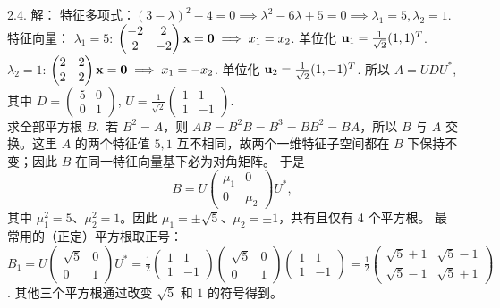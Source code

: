 \begin{exer}
2.4. 解：
特征多项式：$(3-\lambda)^2 - 4 = 0 \implies \lambda^2 - 6\lambda + 5 = 0 \implies \lambda_1 = 5, \lambda_2 = 1$.
特征向量：
$\lambda_1 = 5$: $\begin{pmatrix} -2 & 2 \\ 2 & -2 \end{pmatrix} \mathbf{x} = \mathbf{0} \implies x_1 = x_2$. 单位化 $\mathbf{u}_1 = \frac{1}{\sqrt{2}} (1, 1)^T$.
$\lambda_2 = 1$: $\begin{pmatrix} 2 & 2 \\ 2 & 2 \end{pmatrix} \mathbf{x} = \mathbf{0} \implies x_1 = -x_2$. 单位化 $\mathbf{u}_2 = \frac{1}{\sqrt{2}} (1, -1)^T$.
所以 $A = UDU^*$, 其中 $D = \begin{pmatrix} 5 & 0 \\ 0 & 1 \end{pmatrix}$, $U = \frac{1}{\sqrt{2}} \begin{pmatrix} 1 & 1 \\ 1 & -1 \end{pmatrix}$.
\\
求全部平方根 $B$.~若 $B^2=A$，则 $AB=B^2B=B^3=BB^2=BA$，所以 $B$ 与 $A$ 交换。这里 $A$ 的两个特征值 $5,1$ 互不相同，故两个一维特征子空间都在 $B$ 下保持不变；因此 $B$ 在同一特征向量基下必为对角矩阵。
于是
$$B=U\begin{pmatrix}\mu_1&0\\0&\mu_2\end{pmatrix}U^*,$$
其中 $\mu_1^2=5$、$\mu_2^2=1$。因此 $\mu_1=\pm\sqrt5$、$\mu_2=\pm1$，共有且仅有 4 个平方根。
最常用的（正定）平方根取正号：
$B_1 = U \begin{pmatrix} \sqrt{5} & 0 \\ 0 & 1 \end{pmatrix} U^* = \frac{1}{2} \begin{pmatrix} 1 & 1 \\ 1 & -1 \end{pmatrix} \begin{pmatrix} \sqrt{5} & 0 \\ 0 & 1 \end{pmatrix} \begin{pmatrix} 1 & 1 \\ 1 & -1 \end{pmatrix} = \frac{1}{2} \begin{pmatrix} \sqrt{5}+1 & \sqrt{5}-1 \\ \sqrt{5}-1 & \sqrt{5}+1 \end{pmatrix}$.
其他三个平方根通过改变 $\sqrt{5}$ 和 $1$ 的符号得到。


\end{exer}

